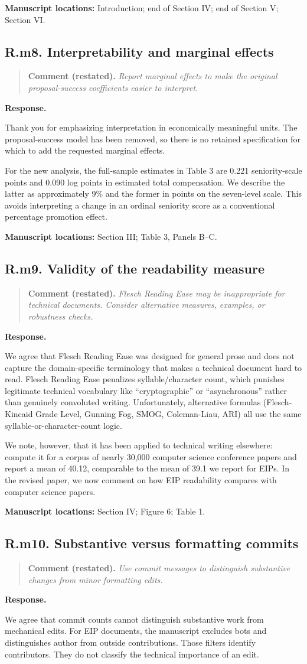 \documentclass[11pt,letterpaper]{article}
\newcommand{\point}[3]{%
  \Needspace{7\baselineskip}
  \subsection*{#1. #2}\phantomsection\label{pt:#1}%
  \begin{quote}\small\textbf{Comment (restated).} \textit{#3}\end{quote}%
  \textbf{Response.}\enspace\ignorespaces}
\newcommand{\locations}[1]{\par{\small\textbf{Manuscript locations:} #1.}\par}
\begin{document}
\locations{Introduction; end of Section IV; end of Section V; Section VI}

\point{R.m8}{Interpretability and marginal effects}{Report marginal effects to make the original proposal-success coefficients easier to interpret.}

Thank you for emphasizing interpretation in economically meaningful units. The proposal-success model has been removed, so there is no retained specification for which to add the requested marginal effects.

For the new analysis, the full-sample estimates in Table 3 are 0.221 seniority-scale points and 0.090 log points in estimated total compensation. We describe the latter as approximately 9\% and the former in points on the seven-level scale. This avoids interpreting a change in an ordinal seniority score as a conventional percentage promotion effect.

\locations{Section III; Table 3, Panels B--C}

\point{R.m9}{Validity of the readability measure}{Flesch Reading Ease may be inappropriate for technical documents. Consider alternative measures, examples, or robustness checks.}

We agree that Flesch Reading Ease was designed for general prose and does not capture the domain-specific terminology that makes a technical document hard to read. Flesch Reading Ease penalizes syllable/character count, which punishes legitimate technical vocabulary like “cryptographic” or “asynchronous” rather than genuinely convoluted writing. Unfortunately, alternative formulas (Flesch-Kincaid Grade Level, Gunning Fog, SMOG, Coleman-Liau, ARI) all use the same syllable-or-character-count logic. 

 We note, however, that it has been applied to technical writing elsewhere: \citet{VainshteinEtAl2019} compute it for a corpus of nearly 30,000 computer science conference papers and report a mean of 40.12, comparable to the mean of 39.1 we report for EIPs. In the revised paper, we now comment on how EIP readability compares with computer science papers. 


\locations{Section IV; Figure 6; Table 1}

\point{R.m10}{Substantive versus formatting commits}{Use commit messages to distinguish substantive changes from minor formatting edits.}

We agree that commit counts cannot distinguish substantive work from mechanical edits. For EIP documents, the manuscript excludes bots and distinguishes author from outside contributions. Those filters identify contributors. They do not classify the technical importance of an edit.
\end{document}
